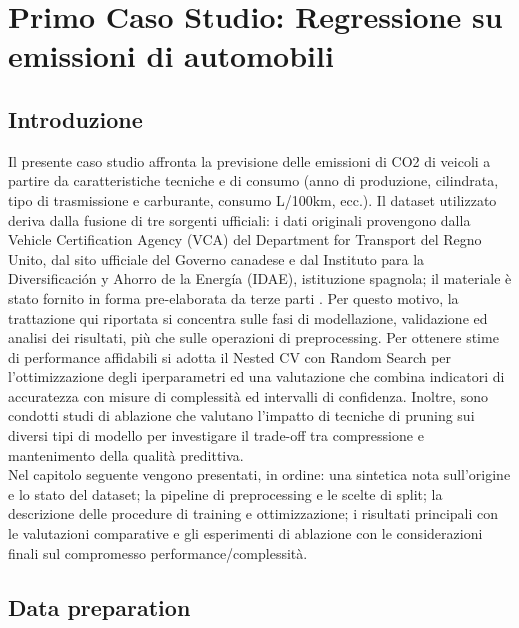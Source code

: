 \documentclass[a4paper,12pt]{report}
\begin{document}
	\chapter{Primo Caso Studio: Regressione su emissioni di automobili}
	
	\section{Introduzione}
	Il presente caso studio affronta la previsione delle emissioni di CO2 di veicoli a partire da caratteristiche tecniche e di consumo (anno di produzione, cilindrata, tipo di trasmissione e carburante, consumo L/100km, ecc.). Il dataset utilizzato deriva dalla fusione di tre sorgenti ufficiali: i dati originali provengono dalla Vehicle Certification Agency (VCA) del Department for Transport del Regno Unito, dal sito ufficiale del Governo canadese e dal Instituto para la Diversificación y Ahorro de la Energía (IDAE), istituzione spagnola; il materiale è stato fornito in forma pre-elaborata da terze parti \cite{olivi2024car}. Per questo motivo, la trattazione qui riportata si concentra sulle fasi di modellazione, validazione ed analisi dei risultati, più che sulle operazioni di preprocessing. Per ottenere stime di performance affidabili si adotta il Nested CV con Random Search per l’ottimizzazione degli iperparametri ed una valutazione che combina indicatori di accuratezza con misure di complessità ed intervalli di confidenza. Inoltre, sono condotti studi di ablazione che valutano l’impatto di tecniche di pruning sui diversi tipi di modello per investigare il trade-off tra compressione e mantenimento della qualità predittiva. \\
	Nel capitolo seguente vengono presentati, in ordine: una sintetica nota sull’origine e lo stato del dataset; la pipeline di preprocessing e le scelte di split; la descrizione delle procedure di training e ottimizzazione; i risultati principali con le valutazioni comparative e gli esperimenti di ablazione con le considerazioni finali sul compromesso performance/complessità.
	
	\section{Data preparation}
	
\end{document}
